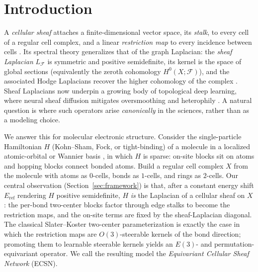 \documentclass[pdflatex,sn-mathphys-num]{sn-jnl}%
\newcommand{\F}{\mathcal{F}}
\newcommand{\X}{X}
\theoremstyle{thmstyleone}
\theoremstyle{thmstyletwo}
\theoremstyle{thmstylethree}
\begin{document}


\maketitle

\section{Introduction}\label{sec:intro}

A \emph{cellular sheaf} attaches a finite-dimensional vector space, its
\emph{stalk}, to every cell of a regular cell complex, and a linear
\emph{restriction map} to every incidence between cells \cite{hansenghrist2019}.
Its spectral theory generalizes that of the graph Laplacian: the \emph{sheaf
Laplacian} $L_\F$ is symmetric and positive semidefinite, its kernel is the
space of global sections (equivalently the zeroth cohomology $H^0(\X;\F)$), and
the associated Hodge Laplacians recover the higher cohomology of the complex
\cite{hansenghrist2019}. Sheaf Laplacians now underpin a growing body of
topological deep learning, where neural sheaf diffusion mitigates oversmoothing
and heterophily \cite{hansengebhart2020,bodnar2022,hajij2022}. A natural
question is where such operators arise \emph{canonically} in the sciences,
rather than as a modeling choice.

We answer this for molecular electronic structure. Consider the single-particle
Hamiltonian $H$ (Kohn--Sham, Fock, or tight-binding) of a molecule in a
localized atomic-orbital or Wannier basis \cite{kohnsham1965,marzari2012}, in
which $H$ is sparse: on-site blocks sit on atoms and hopping blocks connect
bonded atoms. Build a regular cell complex $\X$ from the molecule with atoms as
$0$-cells, bonds as $1$-cells, and rings as $2$-cells. Our central observation
(Section~\ref{sec:framework}) is that, after a constant energy shift
$E_{\mathrm{ref}}$ rendering $H$ positive semidefinite, $H$ \emph{is} the
Laplacian of a cellular sheaf on $\X$: the per-bond two-center blocks factor
through edge stalks to become the restriction maps, and the on-site terms are
fixed by the sheaf-Laplacian diagonal. The classical Slater--Koster two-center
parameterization \cite{slaterkoster1954} is exactly the case in which the
restriction maps are $O(3)$-steerable kernels of the bond direction; promoting
them to learnable steerable kernels yields an $E(3)$- and permutation-equivariant
operator. We call the resulting model the \emph{Equivariant Cellular Sheaf
Network} (ECSN).
\end{document}

